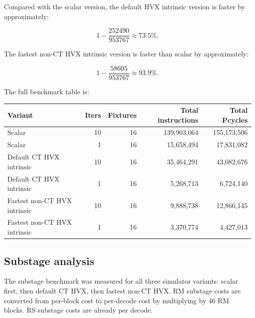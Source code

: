 \documentclass[12pt,a4paper]{article}
\begin{document}
Compared with the scalar version, the default HVX intrinsic version is faster by approximately:

\[
1 - \frac{252490}{953767} \approx 73.5\%.
\]

The fastest non-CT HVX intrinsic version is faster than scalar by approximately:

\[
1 - \frac{58605}{953767} \approx 93.9\%.
\]

The full benchmark table is:

\begin{center}
\begin{tabular}{lrrrr}
\toprule
Variant & Iters & Fixtures & Total instructions & Total Pcycles \\
\midrule
Scalar & 10 & 16 & 139,903,064 & 155,173,506 \\
Scalar & 1 & 16 & 15,658,494 & 17,831,082 \\
Default CT HVX intrinsic & 10 & 16 & 35,464,291 & 43,082,676 \\
Default CT HVX intrinsic & 1 & 16 & 5,268,713 & 6,724,140 \\
Fastest non-CT HVX intrinsic & 10 & 16 & 9,888,738 & 12,866,145 \\
Fastest non-CT HVX intrinsic & 1 & 16 & 3,370,774 & 4,427,013 \\
\bottomrule
\end{tabular}
\end{center}

\subsection{Substage analysis}

The substage benchmark was measured for all three simulator variants: scalar first, then default CT HVX, then fastest non-CT HVX.  RM substage costs are converted from per-block cost to per-decode cost by multiplying by 46 RM blocks.  RS substage costs are already per decode.
\end{document}
